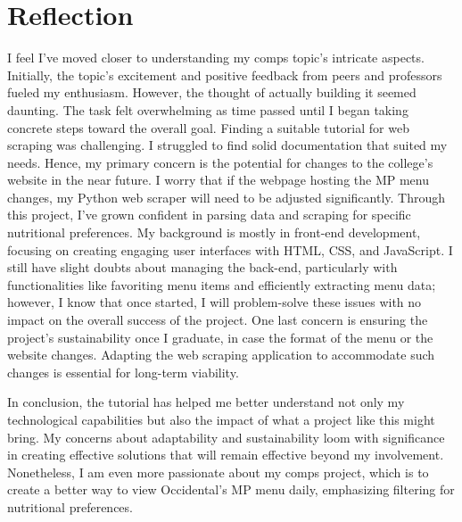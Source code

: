 \documentclass[10pt,twocolumn]{article}
\begin{document}
\section{Reflection}

 I feel I've moved closer to understanding my comps topic's intricate aspects. Initially, the topic's excitement and positive feedback from peers and professors fueled my enthusiasm. However, the thought of actually building it seemed daunting. The task felt overwhelming as time passed until I began taking concrete steps toward the overall goal. Finding a suitable tutorial for web scraping was challenging. I struggled to find solid documentation that suited my needs. Hence, my primary concern is the potential for changes to the college's website in the near future. I worry that if the webpage hosting the MP menu changes, my Python web scraper will need to be adjusted significantly. Through this project, I've grown confident in parsing data and scraping for specific nutritional preferences. My background is mostly in front-end development, focusing on creating engaging user interfaces with HTML, CSS, and JavaScript. I still have slight doubts about managing the back-end, particularly with functionalities like favoriting menu items and efficiently extracting menu data; however, I know that once started, I will problem-solve these issues with no impact on the overall success of the project. One last concern is ensuring the project's sustainability once I graduate, in case the format of the menu or the website changes. Adapting the web scraping application to accommodate such changes is essential for long-term viability.

In conclusion, the tutorial has helped me better understand not only my technological capabilities but also the impact of what a project like this might bring.  My concerns about adaptability and sustainability loom with significance in creating effective solutions that will remain effective beyond my involvement. Nonetheless, I am even more passionate about my comps project, which is to create a better way to view Occidental's MP menu daily, emphasizing filtering for nutritional preferences.




\printbibliography
\end{document}
